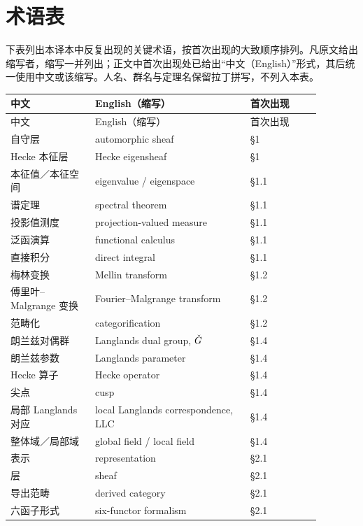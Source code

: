 ﻿\clearpage
\section*{术语表}

下表列出本译本中反复出现的关键术语，按首次出现的大致顺序排列。凡原文给出缩写者，缩写一并列出；正文中首次出现处已给出“中文（English）”形式，其后统一使用中文或该缩写。人名、群名与定理名保留拉丁拼写，不列入本表。

\begin{center}
\small
\begin{longtable}{@{}>{\raggedright\arraybackslash}p{0.24\linewidth}>{\raggedright\arraybackslash}p{0.44\linewidth}>{\raggedright\arraybackslash}p{0.20\linewidth}@{}}
\toprule
中文 & English（缩写） & 首次出现 \\
\midrule
\endfirsthead
\toprule
中文 & English（缩写） & 首次出现 \\
\midrule
\endhead
\bottomrule
\endfoot
自守层 & automorphic sheaf & §1 \\
Hecke 本征层 & Hecke eigensheaf & §1 \\
本征值／本征空间 & eigenvalue / eigenspace & §1.1 \\
谱定理 & spectral theorem & §1.1 \\
投影值测度 & projection-valued measure & §1.1 \\
泛函演算 & functional calculus & §1.1 \\
直接积分 & direct integral & §1.1 \\
梅林变换 & Mellin transform & §1.2 \\
傅里叶--Malgrange 变换 & Fourier--Malgrange transform & §1.2 \\
范畴化 & categorification & §1.2 \\
朗兰兹对偶群 & Langlands dual group, $\check{G}$ & §1.4 \\
朗兰兹参数 & Langlands parameter & §1.4 \\
Hecke 算子 & Hecke operator & §1.4 \\
尖点 & cusp & §1.4 \\
局部 Langlands 对应 & local Langlands correspondence, LLC & §1.4 \\
整体域／局部域 & global field / local field & §1.4 \\
表示 & representation & §2.1 \\
层 & sheaf & §2.1 \\
导出范畴 & derived category & §2.1 \\
六函子形式 & six-functor formalism & §2.1 \\

\end{longtable}
\end{center}
